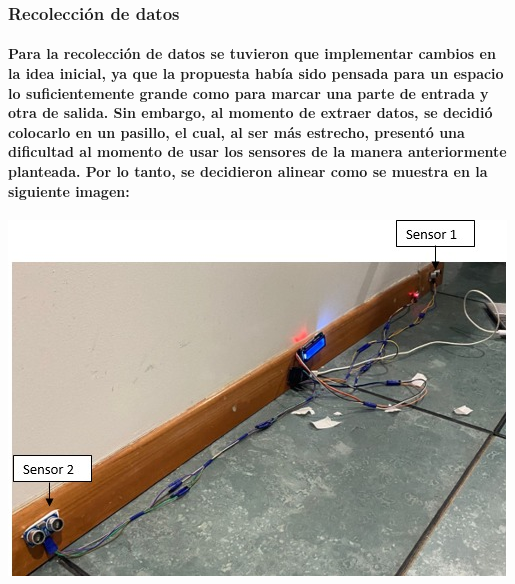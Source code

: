 \documentclass[12pt]{article} %
\newcommand{\normalparagraph}[1]{\paragraph{\textnormal{#1}}}
\begin{document}

\subsubsection{ Recolección de datos} %
\normalparagraph{Para la recolección de datos se tuvieron que implementar cambios en la idea inicial, ya que la propuesta había sido pensada para un espacio lo suficientemente grande como para marcar una parte de entrada y otra de salida. Sin embargo, al momento de extraer datos, se decidió colocarlo en un pasillo, el cual, al ser más estrecho, presentó una dificultad al momento de usar los sensores de la manera anteriormente planteada. Por lo tanto, se decidieron alinear como se muestra en la siguiente imagen:}


\begin{center}
\begin{minipage}[c]{0.45\textwidth} %
  \centering
  \includegraphics[width=\linewidth]{Pictures/Sensores distancia - Colocados.jpg}
  \label{fig:sensores-distancia}
\end{minipage}
\end{center}

\end{document}
